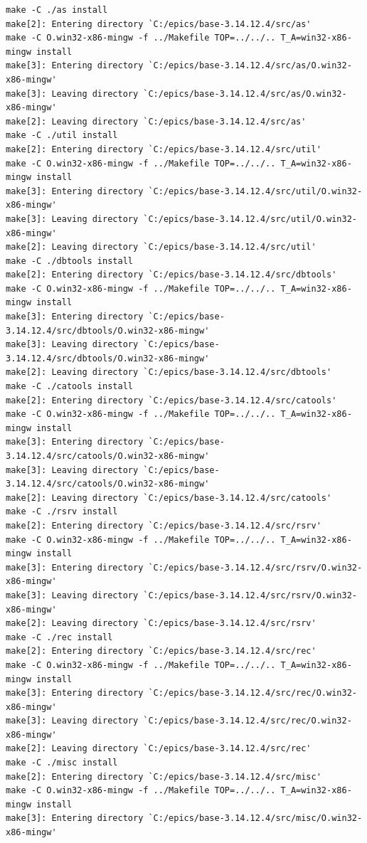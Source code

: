 \documentclass[11pt
  , a4paper
  , article
  , oneside
]{memoir}
\begin{document}
\begin{lstlisting}[style=termstyle]
make -C ./as install
make[2]: Entering directory `C:/epics/base-3.14.12.4/src/as'
make -C O.win32-x86-mingw -f ../Makefile TOP=../../.. T_A=win32-x86-mingw install
make[3]: Entering directory `C:/epics/base-3.14.12.4/src/as/O.win32-x86-mingw'
make[3]: Leaving directory `C:/epics/base-3.14.12.4/src/as/O.win32-x86-mingw'
make[2]: Leaving directory `C:/epics/base-3.14.12.4/src/as'
make -C ./util install
make[2]: Entering directory `C:/epics/base-3.14.12.4/src/util'
make -C O.win32-x86-mingw -f ../Makefile TOP=../../.. T_A=win32-x86-mingw install
make[3]: Entering directory `C:/epics/base-3.14.12.4/src/util/O.win32-x86-mingw'
make[3]: Leaving directory `C:/epics/base-3.14.12.4/src/util/O.win32-x86-mingw'
make[2]: Leaving directory `C:/epics/base-3.14.12.4/src/util'
make -C ./dbtools install
make[2]: Entering directory `C:/epics/base-3.14.12.4/src/dbtools'
make -C O.win32-x86-mingw -f ../Makefile TOP=../../.. T_A=win32-x86-mingw install
make[3]: Entering directory `C:/epics/base-3.14.12.4/src/dbtools/O.win32-x86-mingw'
make[3]: Leaving directory `C:/epics/base-3.14.12.4/src/dbtools/O.win32-x86-mingw'
make[2]: Leaving directory `C:/epics/base-3.14.12.4/src/dbtools'
make -C ./catools install
make[2]: Entering directory `C:/epics/base-3.14.12.4/src/catools'
make -C O.win32-x86-mingw -f ../Makefile TOP=../../.. T_A=win32-x86-mingw install
make[3]: Entering directory `C:/epics/base-3.14.12.4/src/catools/O.win32-x86-mingw'
make[3]: Leaving directory `C:/epics/base-3.14.12.4/src/catools/O.win32-x86-mingw'
make[2]: Leaving directory `C:/epics/base-3.14.12.4/src/catools'
make -C ./rsrv install
make[2]: Entering directory `C:/epics/base-3.14.12.4/src/rsrv'
make -C O.win32-x86-mingw -f ../Makefile TOP=../../.. T_A=win32-x86-mingw install
make[3]: Entering directory `C:/epics/base-3.14.12.4/src/rsrv/O.win32-x86-mingw'
make[3]: Leaving directory `C:/epics/base-3.14.12.4/src/rsrv/O.win32-x86-mingw'
make[2]: Leaving directory `C:/epics/base-3.14.12.4/src/rsrv'
make -C ./rec install
make[2]: Entering directory `C:/epics/base-3.14.12.4/src/rec'
make -C O.win32-x86-mingw -f ../Makefile TOP=../../.. T_A=win32-x86-mingw install
make[3]: Entering directory `C:/epics/base-3.14.12.4/src/rec/O.win32-x86-mingw'
make[3]: Leaving directory `C:/epics/base-3.14.12.4/src/rec/O.win32-x86-mingw'
make[2]: Leaving directory `C:/epics/base-3.14.12.4/src/rec'
make -C ./misc install
make[2]: Entering directory `C:/epics/base-3.14.12.4/src/misc'
make -C O.win32-x86-mingw -f ../Makefile TOP=../../.. T_A=win32-x86-mingw install
make[3]: Entering directory `C:/epics/base-3.14.12.4/src/misc/O.win32-x86-mingw'

\end{lstlisting}
\end{document}
